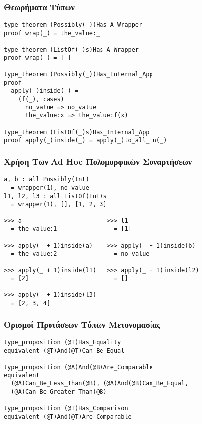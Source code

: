 \documentclass{beamer}
\def\e{\foreignlanguage{english}}
\begin{document}
\begin{frame}[fragile]

\frametitle{Θεωρήματα Τύπων}

\begin{otherlanguage}{english}
\begin{verbatim}
type_theorem (Possibly(_))Has_A_Wrapper
proof wrap(_) = the_value:_

type_theorem (ListOf(_)s)Has_A_Wrapper
proof wrap(_) = [_]

type_theorem (Possibly(_))Has_Internal_App
proof
  apply(_)inside(_) =
    (f(_), cases)
      no_value => no_value
      the_value:x => the_value:f(x)

type_theorem (ListOf(_)s)Has_Internal_App
proof apply(_)inside(_) = apply(_)to_all_in(_)
\end{verbatim}
\end{otherlanguage}

\end{frame}

\begin{frame}[fragile]

\frametitle{Χρήση Των \e{Ad Hoc} Πολυμορφικών Συναρτήσεων}

\begin{otherlanguage}{english}
\begin{verbatim}
a, b : all Possibly(Int)
  = wrapper(1), no_value
l1, l2, l3 : all ListOf(Int)s
  = wrapper(1), [], [1, 2, 3]

>>> a                        >>> l1
  = the_value:1                = [1]

>>> apply(_ + 1)inside(a)    >>> apply(_ + 1)inside(b)
  = the_value:2                = no_value

>>> apply(_ + 1)inside(l1)   >>> apply(_ + 1)inside(l2)
  = [2]                        = []

>>> apply(_ + 1)inside(l3)
  = [2, 3, 4]
\end{verbatim}
\end{otherlanguage}

\end{frame}

\begin{frame}[fragile]

\frametitle{Ορισμοί Προτάσεων Τύπων Μετονομασίας}

\begin{otherlanguage}{english}
\begin{verbatim}
type_proposition (@T)Has_Equality
equivalent (@T)And(@T)Can_Be_Equal

type_proposition (@A)And(@B)Are_Comparable
equivalent
  (@A)Can_Be_Less_Than(@B), (@A)And(@B)Can_Be_Equal,
  (@A)Can_Be_Greater_Than(@B)

type_proposition (@T)Has_Comparison
equivalent (@T)And(@T)Are_Comparable
\end{verbatim}
\end{otherlanguage}

\end{frame}
\end{document}
